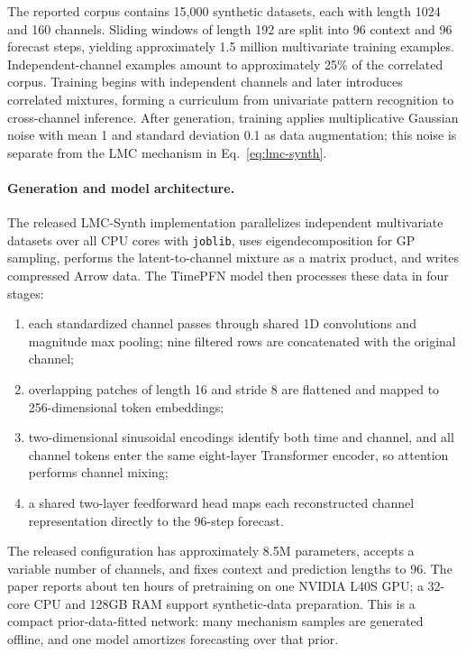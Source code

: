 The reported corpus contains 15,000 synthetic datasets, each with length 1024
and 160 channels. Sliding windows of length 192 are split into 96 context and
96 forecast steps, yielding approximately 1.5 million multivariate training
examples. Independent-channel examples amount to approximately 25\% of the
correlated corpus. Training begins with independent channels and later
introduces correlated mixtures, forming a curriculum from univariate pattern
recognition to cross-channel inference. After generation, training applies
multiplicative Gaussian noise with mean 1 and standard deviation 0.1 as data
augmentation; this noise is separate from the LMC mechanism in
Eq.~\eqref{eq:lmc-synth}.

\paragraph{Generation and model architecture.}
The released LMC-Synth implementation parallelizes independent multivariate
datasets over all CPU cores with \texttt{joblib}, uses eigendecomposition for
GP sampling, performs the latent-to-channel mixture as a matrix product, and
writes compressed Arrow data. The TimePFN model then processes these data in
four stages:

\begin{enumerate}
    \item each standardized channel passes through shared 1D convolutions and
    magnitude max pooling; nine filtered rows are concatenated with the
    original channel;
    \item overlapping patches of length 16 and stride 8 are flattened and
    mapped to 256-dimensional token embeddings;
    \item two-dimensional sinusoidal encodings identify both time and channel,
    and all channel tokens enter the same eight-layer Transformer encoder, so
    attention performs channel mixing;
    \item a shared two-layer feedforward head maps each reconstructed channel
    representation directly to the 96-step forecast.
\end{enumerate}

The released configuration has approximately 8.5M parameters, accepts a
variable number of channels, and fixes context and prediction lengths to 96.
The paper reports about ten hours of pretraining on one NVIDIA L40S GPU; a
32-core CPU and 128GB RAM support synthetic-data preparation. This is a
compact prior-data-fitted network: many mechanism samples are generated
offline, and one model amortizes forecasting over that prior.

